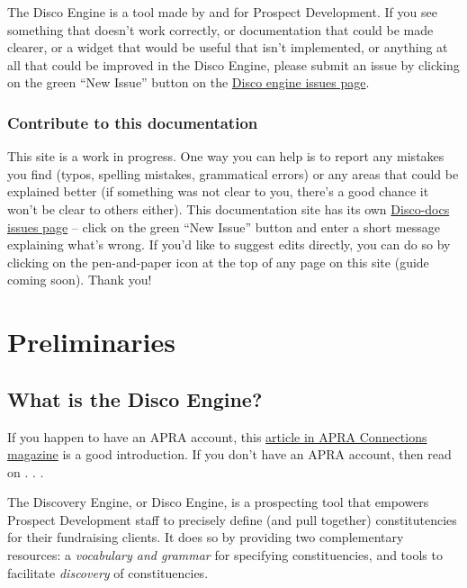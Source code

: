 \documentclass[]{book}
\begin{document}
The Disco Engine is a tool made by and for Prospect Development. If you see something that doesn't work correctly, or documentation that could be made clearer, or a widget that would be useful that isn't implemented, or anything at all that could be improved in the Disco Engine, please submit an issue by clicking on the green ``New Issue'' button on the \href{https://github.com/tarakc02/discoveryengine/issues}{Disco engine issues page}.

\hypertarget{contribute-to-this-documentation}{%
\section{Contribute to this documentation}\label{contribute-to-this-documentation}}

This site is a work in progress. One way you can help is to report any mistakes you find (typos, spelling mistakes, grammatical errors) or any areas that could be explained better (if something was not clear to you, there's a good chance it won't be clear to others either). This documentation site has its own \href{https://github.com/tarakc02/discodocs/issues}{Disco-docs issues page} -- click on the green ``New Issue'' button and enter a short message explaining what's wrong. If you'd like to suggest edits directly, you can do so by clicking on the pen-and-paper icon at the top of any page on this site (guide coming soon). Thank you!

\hypertarget{part-preliminaries}{%
\part{Preliminaries}\label{part-preliminaries}}

\hypertarget{what-is-disco}{%
\chapter{What is the Disco Engine?}\label{what-is-disco}}

If you happen to have an APRA account, this \href{http://connections.aprahome.org/blog/building-the-discovery-engine}{article in APRA Connections magazine} is a good introduction. If you don't have an APRA account, then read on . . .

The Discovery Engine, or Disco Engine, is a prospecting tool that empowers Prospect Development staff to precisely define (and pull together) constitutencies for their fundraising clients. It does so by providing two complementary resources: a \emph{vocabulary and grammar} for specifying constituencies, and tools to facilitate \emph{discovery} of constituencies.
\end{document}
